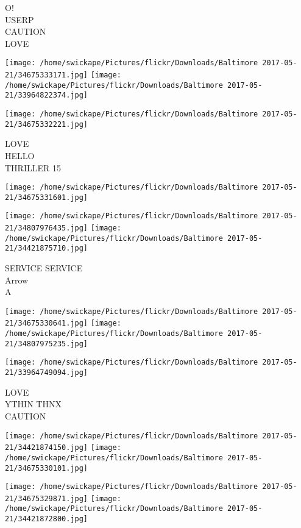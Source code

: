\documentclass[10pt,letterpaper]{article}
\begin{document}
O!\\
USERP\\
CAUTION\\
LOVE\\
\pagebreak

\texttt{[image: /home/swickape/Pictures/flickr/Downloads/Baltimore 2017-05-21/34675333171.jpg]}
\texttt{[image: /home/swickape/Pictures/flickr/Downloads/Baltimore 2017-05-21/33964822374.jpg]}

\texttt{[image: /home/swickape/Pictures/flickr/Downloads/Baltimore 2017-05-21/34675332221.jpg]}

LOVE\\
HELLO\\
THRILLER 15\\
\pagebreak

\texttt{[image: /home/swickape/Pictures/flickr/Downloads/Baltimore 2017-05-21/34675331601.jpg]}

\vspace{0.25in}
\texttt{[image: /home/swickape/Pictures/flickr/Downloads/Baltimore 2017-05-21/34807976435.jpg]}
\texttt{[image: /home/swickape/Pictures/flickr/Downloads/Baltimore 2017-05-21/34421875710.jpg]}

SERVICE SERVICE\\
Arrow\\
A\\
\pagebreak

\texttt{[image: /home/swickape/Pictures/flickr/Downloads/Baltimore 2017-05-21/34675330641.jpg]}
\texttt{[image: /home/swickape/Pictures/flickr/Downloads/Baltimore 2017-05-21/34807975235.jpg]}

\vspace{0.25in}
\texttt{[image: /home/swickape/Pictures/flickr/Downloads/Baltimore 2017-05-21/33964749094.jpg]}

LOVE\\
YTHIN THNX\\
CAUTION\\
\pagebreak

\texttt{[image: /home/swickape/Pictures/flickr/Downloads/Baltimore 2017-05-21/34421874150.jpg]}
\texttt{[image: /home/swickape/Pictures/flickr/Downloads/Baltimore 2017-05-21/34675330101.jpg]}

\texttt{[image: /home/swickape/Pictures/flickr/Downloads/Baltimore 2017-05-21/34675329871.jpg]}
\texttt{[image: /home/swickape/Pictures/flickr/Downloads/Baltimore 2017-05-21/34421872800.jpg]}
\end{document}
